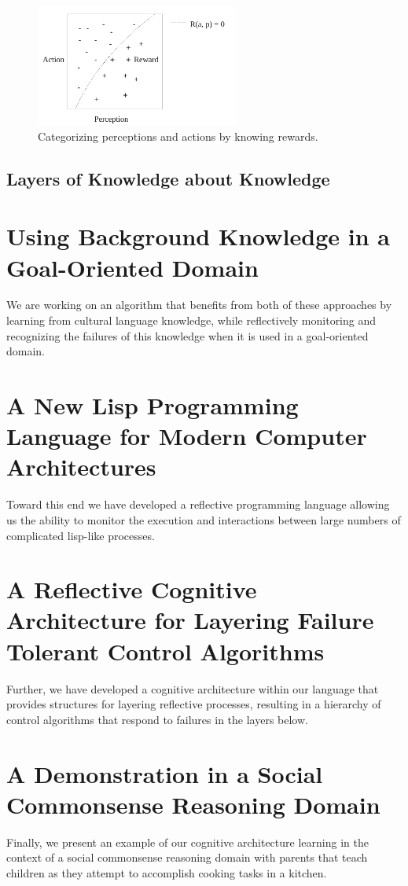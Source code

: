 \begin{figure}[bth]
  \center
  \includegraphics[height=4cm]{gfx/perception_categorization}
  \caption[Categorizing perceptions and actions by knowing rewards]{Categorizing perceptions and actions by knowing rewards.}
  \label{fig:perception_categorization}
\end{figure}




\subsection{Layers of Knowledge about Knowledge}



\section{Using Background Knowledge in a Goal-Oriented Domain}

We are working on an algorithm that benefits from both of these
approaches by learning from cultural language knowledge, while
reflectively monitoring and recognizing the failures of this knowledge
when it is used in a goal-oriented domain.

\section{A New Lisp Programming Language for Modern Computer Architectures}

Toward this end we have developed a reflective programming language
allowing us the ability to monitor the execution and interactions
between large numbers of complicated lisp-like processes.

\section{A Reflective Cognitive Architecture for Layering Failure Tolerant Control Algorithms}

Further, we have developed a cognitive architecture within our
language that provides structures for layering reflective processes,
resulting in a hierarchy of control algorithms that respond to
failures in the layers below.

\section{A Demonstration in a Social Commonsense Reasoning Domain}

Finally, we present an example of our cognitive architecture learning
in the context of a social commonsense reasoning domain with parents
that teach children as they attempt to accomplish cooking tasks in a
kitchen.

